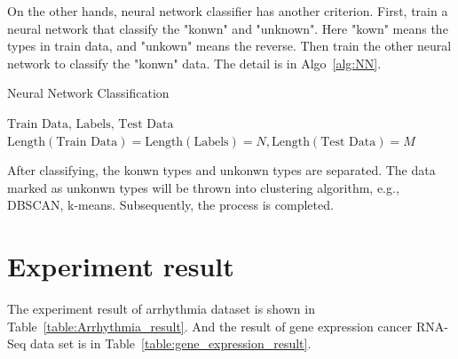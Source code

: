 \documentclass[twocolumn,10pt]{article}
\begin{document}
  On the other hands, neural network classifier has another criterion. First, train a neural network that classify the 
  "konwn" and "unknown". Here "kown" means the types in train data, and "unkown" means the reverse. Then train the other 
  neural network to classify the "konwn" data. The detail is in Algo~\ref{alg:NN}.
  \begin{algorithm}[tb]
    \caption{Neural Network Classification}\label{alg:NN}
    \begin{algorithmic}[1]
      \Require $\text{Train Data, Labels, Test Data}$
      \Assume $\text{Length}(\text{Train Data})=\text{Length}(\text{Labels})=N,\text{Length}(\text{Test Data})=M$
    \end{algorithmic}
  \end{algorithm}

  After classifying, the konwn types and unkonwn types are separated. The data marked as unkonwn types will be thrown 
  into clustering algorithm, e.g., DBSCAN, k-means. Subsequently, the process is completed.

\section{Experiment result}
  The experiment result of arrhythmia dataset is shown in Table~\ref{table:Arrhythmia_result}. And the result of gene 
  expression cancer RNA-Seq data set is in Table~\ref{table:gene_expression_result}. 
\end{document}
